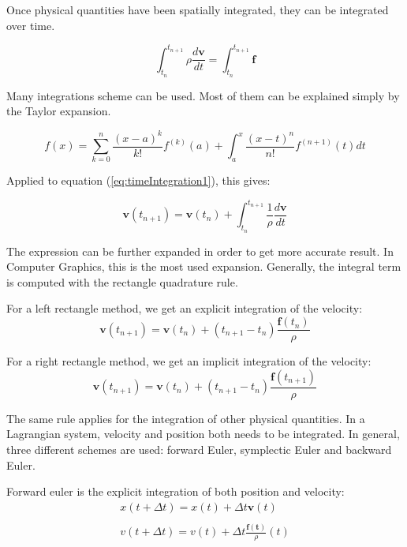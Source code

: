 Once physical quantities have been spatially integrated, they can be integrated over time. 

\begin{equation}
\label{eq:timeIntegration1}
\displaystyle
\int_{t_{n}}^{t_{n+1}}
\rho \frac{d\mathbf{v}}{dt}
=
\int_{t_{n}}^{t_{n+1}}\mathbf{f}
\end{equation}

Many integrations scheme can be used. Most of them can be explained simply by the Taylor expansion.

\begin{equation}
\label{eq:taylorExpansion}
\displaystyle
f(x) = \sum_{k=0}^{n}\frac{\left(x-a\right)^{k}}{k!}f^{(k)}(a) + \int_{a}^{x}\frac{\left(x-t\right)^{n}}{n!}f^{(n+1)}(t)dt
\end{equation}

Applied to equation (\ref{eq:timeIntegration1}), this gives:

\begin{equation}
\label{eq:timeIntegration2}
\displaystyle
\mathbf{v}(t_{n+1}) = \mathbf{v}(t_{n}) + \int_{t_{n}}^{t_{n+1}}\frac{1}{\rho}\frac{d\mathbf{v}}{dt}
\end{equation}

The expression can be further expanded in order to get more accurate result. In Computer Graphics, this is the most used expansion. Generally, the integral term is computed with the rectangle quadrature rule.

For a left rectangle method, we get an explicit integration of the velocity:
\begin{equation}
\label{eq:explicitIntegration}
\mathbf{v}(t_{n+1}) = \mathbf{v}(t_{n}) + \left(t_{n+1}-t_{n}\right) \frac{\mathbf{f}(t_{n})}{\rho}
\end{equation}

For a right rectangle method, we get an implicit integration of the velocity:
\begin{equation}
\label{eq:implicitIntegration}
\mathbf{v}(t_{n+1}) = \mathbf{v}(t_{n}) + \left(t_{n+1}-t_{n}\right) \frac{\mathbf{f}(t_{n+1})}{\rho}
\end{equation}

The same rule applies for the integration of other physical quantities. In a Lagrangian system, velocity and position both needs to be integrated. In general, three different schemes are used: forward Euler, symplectic Euler and backward Euler.

Forward euler is the explicit integration of both position and velocity:
\begin{equation}
\label{eq:explicitEuler}
\begin{array}{l}
\displaystyle x(t+\Delta t) = x(t) + \Delta t \mathbf{v}(t) \\ \\
\displaystyle v(t+\Delta t) = v(t) + \Delta t \frac{\mathbf{f(t)}}{\rho}(t)
\end{array}
\end{equation}

